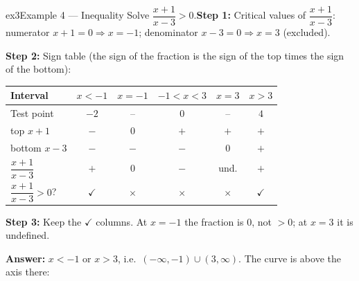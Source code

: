 \documentclass[11pt]{article}
\begin{document}
\begin{example}{ex3}{Example 4 --- Inequality}
Solve $\dfrac{x+1}{x-3}>0$.\soln \textbf{Step 1:} Critical values of $\dfrac{x+1}{x-3}$: numerator $x+1=0\Rightarrow x=-1$; denominator $x-3=0\Rightarrow x=3$ (excluded).

\textbf{Step 2:} Sign table (the sign of the fraction is the sign of the top times the sign of the bottom):\begin{center}\small\setlength{\tabcolsep}{4pt}\renewcommand{\arraystretch}{1.2}
\begin{tabular}{l|ccccc}
\hline
Interval & $x<-1$ & $x=-1$ & $-1<x<3$ & $x=3$ & $x>3$ \\ \hline
Test point & $-2$ & -- & $0$ & -- & $4$ \\ \hline
{\scriptsize top} $x+1$ & $-$ & $0$ & $+$ & $+$ & $+$ \\
{\scriptsize bottom} $x-3$ & $-$ & $-$ & $-$ & $0$ & $+$ \\
\hline
$\dfrac{x+1}{x-3}$ & $+$ & $0$ & $-$ & und. & $+$ \\ \hline
$\dfrac{x+1}{x-3}>0$? & $\checkmark$ & $\times$ & $\times$ & $\times$ & $\checkmark$ \\ \hline
\end{tabular}\end{center}\textbf{Step 3:} Keep the $\checkmark$ columns. At $x=-1$ the fraction is $0$, not $>0$; at $x=3$ it is undefined.

\textbf{Answer:} $x<-1\text{ or }x>3$, i.e.\ $(-\infty,-1)\cup(3,\infty)$. The curve is above the axis there:\begin{center}\end{center}
\end{example}
\end{document}
